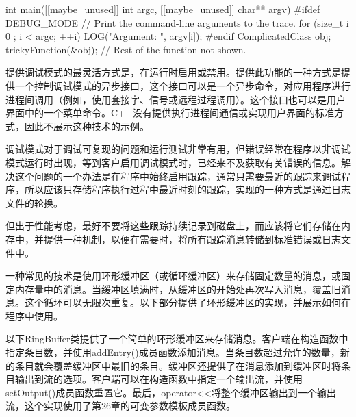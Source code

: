 \begin{cpp}
int main([[maybe_unused]] int argc, [[maybe_unused]] char** argv)
{
#ifdef DEBUG_MODE
    // Print the command-line arguments to the trace.
    for (size_t i { 0 }; i < argc; ++i) { LOG("Argument: ", argv[i]); }
#endif
    ComplicatedClass obj;
    trickyFunction(&obj);
    // Rest of the function not shown.
}
\end{cpp}


提供调试模式的最灵活方式是，在运行时启用或禁用。提供此功能的一种方式是提供一个控制调试模式的异步接口，这个接口可以是一个异步命令，对应用程序进行进程间调用（例如，使用套接字、信号或远程过程调用）。这个接口也可以是用户界面中的一个菜单命令。C++没有提供执行进程间通信或实现用户界面的标准方式，因此不展示这种技术的示例。


调试模式对于调试可复现的问题和运行测试非常有用，但错误经常在程序以非调试模式运行时出现，等到客户启用调试模式时，已经来不及获取有关错误的信息。解决这个问题的一个办法是在程序中始终启用跟踪，通常只需要最近的跟踪来调试程序，所以应该只存储程序执行过程中最近时刻的跟踪，实现的一种方式是通过日志文件的轮换。

但出于性能考虑，最好不要将这些跟踪持续记录到磁盘上，而应该将它们存储在内存中，并提供一种机制，以便在需要时，将所有跟踪消息转储到标准错误或日志文件中。

一种常见的技术是使用环形缓冲区（或循环缓冲区）来存储固定数量的消息，或固定内存量中的消息。当缓冲区填满时，从缓冲区的开始处再次写入消息，覆盖旧消息。这个循环可以无限次重复。以下部分提供了环形缓冲区的实现，并展示如何在程序中使用。


以下RingBuffer类提供了一个简单的环形缓冲区来存储消息。客户端在构造函数中指定条目数，并使用addEntry()成员函数添加消息。当条目数超过允许的数量，新的条目就会覆盖缓冲区中最旧的条目。缓冲区还提供了在消息添加到缓冲区时将条目输出到流的选项。客户端可以在构造函数中指定一个输出流，并使用setOutput()成员函数重置它。最后，operator<{}<将整个缓冲区输出到一个输出流，这个实现使用了第26章的可变参数模板成员函数。

